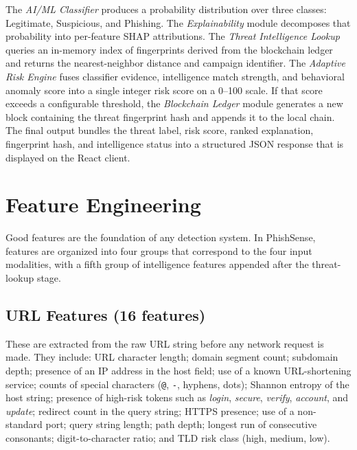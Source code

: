 \documentclass[conference]{IEEEtran}
\begin{document}
The \textit{AI/ML Classifier} produces a probability distribution over three classes:
Legitimate, Suspicious, and Phishing.
The \textit{Explainability} module decomposes that probability into per-feature SHAP attributions.
The \textit{Threat Intelligence Lookup} queries an in-memory index of fingerprints derived from the
blockchain ledger and returns the nearest-neighbor distance and campaign identifier.
The \textit{Adaptive Risk Engine} fuses classifier evidence, intelligence match strength, and
behavioral anomaly score into a single integer risk score on a 0--100 scale.
If that score exceeds a configurable threshold, the \textit{Blockchain Ledger} module generates a
new block containing the threat fingerprint hash and appends it to the local chain.
The final output bundles the threat label, risk score, ranked explanation, fingerprint hash, and
intelligence status into a structured JSON response that is displayed on the React client.

\section{Feature Engineering}

Good features are the foundation of any detection system.
In PhishSense, features are organized into four groups that correspond to the four input
modalities, with a fifth group of intelligence features appended after the threat-lookup stage.

\subsection{URL Features (16 features)}
These are extracted from the raw URL string before any network request is made.
They include: URL character length; domain segment count; subdomain depth; presence of an IP
address in the host field; use of a known URL-shortening service; counts of special characters
(\texttt{@}, \texttt{-}, hyphens, dots); Shannon entropy of the host string; presence of
high-risk tokens such as \textit{login}, \textit{secure}, \textit{verify}, \textit{account},
and \textit{update}; redirect count in the query string; HTTPS presence; use of a non-standard
port; query string length; path depth; longest run of consecutive consonants; digit-to-character
ratio; and TLD risk class (high, medium, low).
\end{document}
